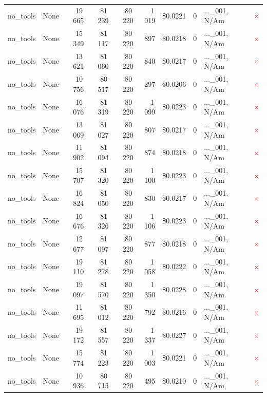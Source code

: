 \documentclass[a4paper,11pt]{article}
\begin{document}
\begin{table}[H]
{\begin{tabular}{l r r r r r r r l c}
no\_tools & None & 19\,665 & 81\,239 & 80\,220 & 1\,019 & \$0.0221 & 0 & ...\_001, N/Am & \textcolor{red}{\(\times\)} \\
no\_tools & None & 15\,349 & 81\,117 & 80\,220 & 897 & \$0.0218 & 0 & ...\_001, N/Am & \textcolor{red}{\(\times\)} \\
no\_tools & None & 13\,621 & 81\,060 & 80\,220 & 840 & \$0.0217 & 0 & ...\_001, N/Am & \textcolor{red}{\(\times\)} \\
no\_tools & None & 10\,756 & 80\,517 & 80\,220 & 297 & \$0.0206 & 0 & ...\_001, N/Am & \textcolor{red}{\(\times\)} \\
no\_tools & None & 16\,076 & 81\,319 & 80\,220 & 1\,099 & \$0.0223 & 0 & ...\_001, N/Am & \textcolor{red}{\(\times\)} \\
no\_tools & None & 13\,069 & 81\,027 & 80\,220 & 807 & \$0.0217 & 0 & ...\_001, N/Am & \textcolor{red}{\(\times\)} \\
no\_tools & None & 11\,902 & 81\,094 & 80\,220 & 874 & \$0.0218 & 0 & ...\_001, N/Am & \textcolor{red}{\(\times\)} \\
no\_tools & None & 15\,707 & 81\,320 & 80\,220 & 1\,100 & \$0.0223 & 0 & ...\_001, N/Am & \textcolor{red}{\(\times\)} \\
no\_tools & None & 16\,824 & 81\,050 & 80\,220 & 830 & \$0.0217 & 0 & ...\_001, N/Am & \textcolor{red}{\(\times\)} \\
no\_tools & None & 16\,676 & 81\,326 & 80\,220 & 1\,106 & \$0.0223 & 0 & ...\_001, N/Am & \textcolor{red}{\(\times\)} \\
no\_tools & None & 12\,677 & 81\,097 & 80\,220 & 877 & \$0.0218 & 0 & ...\_001, N/Am & \textcolor{red}{\(\times\)} \\
no\_tools & None & 19\,110 & 81\,278 & 80\,220 & 1\,058 & \$0.0222 & 0 & ...\_001, N/Am & \textcolor{red}{\(\times\)} \\
no\_tools & None & 19\,097 & 81\,570 & 80\,220 & 1\,350 & \$0.0228 & 0 & ...\_001, N/Am & \textcolor{red}{\(\times\)} \\
no\_tools & None & 11\,695 & 81\,012 & 80\,220 & 792 & \$0.0216 & 0 & ...\_001, N/Am & \textcolor{red}{\(\times\)} \\
no\_tools & None & 19\,172 & 81\,557 & 80\,220 & 1\,337 & \$0.0227 & 0 & ...\_001, N/Am & \textcolor{red}{\(\times\)} \\
no\_tools & None & 15\,774 & 81\,223 & 80\,220 & 1\,003 & \$0.0221 & 0 & ...\_001, N/Am & \textcolor{red}{\(\times\)} \\
no\_tools & None & 10\,936 & 80\,715 & 80\,220 & 495 & \$0.0210 & 0 & ...\_001, N/Am & \textcolor{red}{\(\times\)} \\

\end{tabular}}
\end{table}
\end{document}

